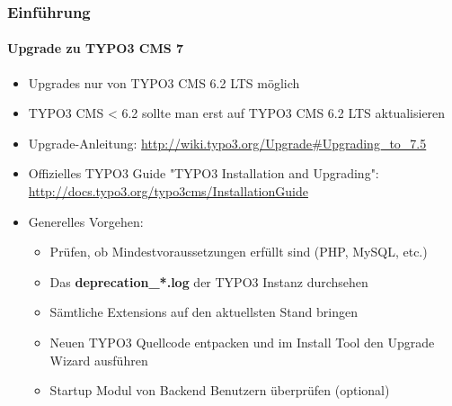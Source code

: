 \begin{frame}[fragile]
	\frametitle{Einführung}
	\framesubtitle{Upgrade zu TYPO3 CMS 7}

	\begin{itemize}
		\item Upgrades nur von TYPO3 CMS 6.2 LTS möglich
		\item TYPO3 CMS < 6.2 sollte man erst auf TYPO3 CMS 6.2 LTS aktualisieren
	\end{itemize}

	\begin{itemize}

		\item Upgrade-Anleitung:\newline
			\smaller\url{http://wiki.typo3.org/Upgrade#Upgrading_to_7.5}\normalsize
		\item Offizielles TYPO3 Guide "TYPO3 Installation and Upgrading":
			\smaller\url{http://docs.typo3.org/typo3cms/InstallationGuide}\normalsize
		\item Generelles Vorgehen:
			\begin{itemize}
				\item Prüfen, ob Mindestvoraussetzungen erfüllt sind \small(PHP, MySQL, etc.)
				\item Das \textbf{deprecation\_*.log} der TYPO3 Instanz durchsehen
				\item Sämtliche Extensions auf den aktuellsten Stand bringen
				\item Neuen TYPO3 Quellcode entpacken und im Install Tool den Upgrade Wizard ausführen
				\item Startup Modul von Backend Benutzern überprüfen (optional)
			\end{itemize}
	\end{itemize}

\end{frame}

